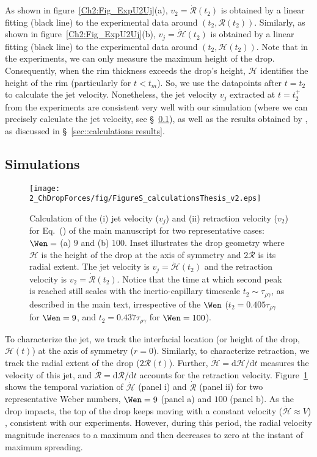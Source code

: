 \begin{subappendices}
	As shown in figure~\ref{Ch2:Fig_ExpU2Uj}(a), $v_2= \dot{\mathcal{R}}(t_2)$ is obtained by a linear fitting (black line) to the experimental data around $(t_2, \mathcal{R}(t_2))$. Similarly, as shown in figure~\ref{Ch2:Fig_ExpU2Uj}(b), $v_j = \dot{\mathcal{H}}(t_2)$ is obtained by a linear fitting (black line) to the experimental data around $(t_2, \mathcal{H}(t_2))$. Note that in the experiments, we can only measure the maximum height of the drop. Consequently, when the rim thickness exceeds the drop's height, $\mathcal{H}$ identifies the height of the rim (particularly for $t < t_m$). So, we use the datapoints after $t = t_2$ to calculate the jet velocity. Nonetheless, the jet velocity $v_j$ extracted at $t = t_2^{+}$ from the experiments are consistent very well with our simulation (where we can precisely calculate the jet velocity, see \S~\ref{sec::calculations Sim}), as well as the results obtained by \citet{bartolo2006singular}, as discussed in \S~\ref{sec::calculations results}.
	
	
	\subsection{Simulations}
	\label{sec::calculations Sim}
	
	\begin{sidewaysfigure}
		\texttt{[image: 2\_ChDropForces/fig/FigureS\_calculationsThesis\_v2.eps]}
		\caption{Calculation of the (i) jet velocity ($v_j$) and (ii) retraction velocity ($v_2$) for Eq.~() of the main manuscript for two representative cases: $\Wen =$ (a) $9$ and (b) $100$. Inset illustrates the drop geometry where $\mathcal{H}$ is the height of the drop at the axis of symmetry and $2\mathcal{R}$ is its radial extent. The jet velocity is $v_j = \dot{\mathcal{H}}(t_2)$ and the retraction velocity is $v_2 = \dot{\mathcal{R}}(t_2)$. Notice that the time at which second peak is reached still scales with the inertio-capillary timescale $t_2 \sim \tau_{\rho\gamma}$, as described in the main text, irrespective of the $\Wen$ ($t_2 = 0.405\tau_{\rho\gamma}$ for $\Wen = 9$, and $t_2 = 0.437\tau_{\rho\gamma}$ for $\Wen = 100$).}
		\label{Ch2:Fig_calculations}
	\end{sidewaysfigure}

	To characterize the jet, we track the interfacial location (or height of the drop, $\mathcal{H}(t)$) at the axis of symmetry ($r = 0$). Similarly, to characterize retraction, we track the radial extent of the drop ($2\mathcal{R}(t)$). Further, $\dot{\mathcal{H}} = \mathrm{d}\mathcal{H}/\mathrm{d}t$ measures the velocity of this jet, and $\dot{\mathcal{R}} = \mathrm{d}\mathcal{R}/\mathrm{d}t$ accounts for the retraction velocity. Figure~\ref{Ch2:Fig_calculations} shows the temporal variation of $\dot{\mathcal{H}}$ (panel i) and $\dot{\mathcal{R}}$ (panel ii) for two representative Weber numbers, $\Wen = 9$ (panel a) and $100$ (panel b). As the drop impacts, the top of the drop keeps moving with a constant velocity ($\dot{\mathcal{H}} \approx V$) \cite{eggers2010drop, Gordillo2018}, consistent with our experiments. However, during this period, the radial velocity magnitude increases to a maximum and then decreases to zero at the instant of maximum spreading. 
	

\end{subappendices}
